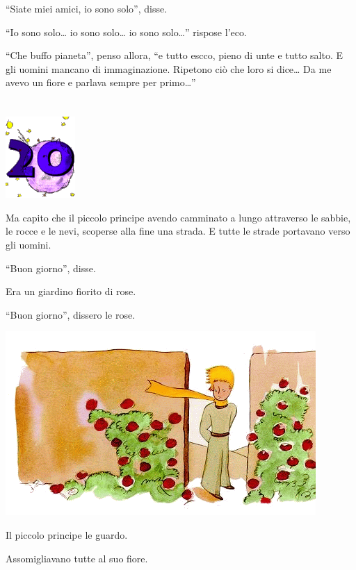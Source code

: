 \documentclass[11pt]{scrbook}
\begin{document}
``Siate miei amici, io sono solo'', disse.

``Io sono solo\ldots{} io sono solo\ldots{} io sono solo\ldots{}''
rispose l'eco.

``Che buffo pianeta'', penso allora, ``e tutto escco, pieno di unte e
tutto salto. E gli uomini mancano di immaginazione. Ripetono ciò che
loro si dice\ldots{} Da me avevo un fiore e parlava sempre per
primo\ldots{}''

\chapter{}
\begin{center}
\includegraphics{./img/chapter20.png}
\end{center}

Ma capito che il piccolo principe avendo camminato a lungo attraverso le
sabbie, le rocce e le nevi, scoperse alla fine una strada. E tutte le
strade portavano verso gli uomini.

``Buon giorno'', disse.

Era un giardino fiorito di rose.

``Buon giorno'', dissero le rose.

\begin{center}
\includegraphics{./img/20a.png}
\end{center}

Il piccolo principe le guardo.

Assomigliavano tutte al suo fiore.
\end{document}
